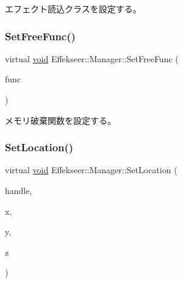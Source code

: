 エフェクト読込クラスを設定する。 

\mbox{\label{class_effekseer_1_1_manager_a81402561ce17b0d4c681811affbd7340}} 
\subsubsection{\texorpdfstring{Set\+Free\+Func()}{SetFreeFunc()}}
{\footnotesize\ttfamily virtual \mbox{\hyperlink{namespace_effekseer_ab34c4088e512200cf4c2716f168deb56}{void}} Effekseer\+::\+Manager\+::\+Set\+Free\+Func (\begin{DoxyParamCaption}\item[{Free\+Func}]{func }\end{DoxyParamCaption})\hspace{0.3cm}{\ttfamily [pure virtual]}}



メモリ破棄関数を設定する。 

\mbox{\label{class_effekseer_1_1_manager_aa35fc7968dadeb82e58bb0c472dfb8b1}} 
\subsubsection{\texorpdfstring{Set\+Location()}{SetLocation()}\hspace{0.1cm}{\footnotesize\ttfamily [1/2]}}
{\footnotesize\ttfamily virtual \mbox{\hyperlink{namespace_effekseer_ab34c4088e512200cf4c2716f168deb56}{void}} Effekseer\+::\+Manager\+::\+Set\+Location (\begin{DoxyParamCaption}\item[{\mbox{\hyperlink{namespace_effekseer_afba58b8d812da862190e9bbfc040824a}{Handle}}}]{handle,  }\item[{float}]{x,  }\item[{float}]{y,  }\item[{float}]{z }\end{DoxyParamCaption})\hspace{0.3cm}{\ttfamily [pure virtual]}}



